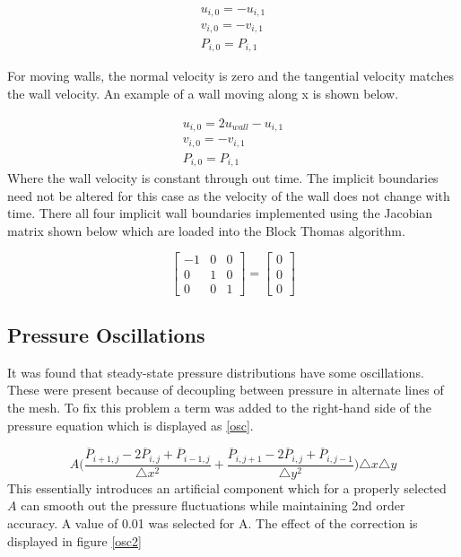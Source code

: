 \documentclass[paper=a4, fontsize=11pt, abstract=on]{scrartcl}
\numberwithin{equation}{section}		%
\numberwithin{figure}{section}			%
\numberwithin{table}{section}				%
\begin{document}
\begin{equation}
  \begin{aligned}
 u_{i,0} = -u_{i,1}
  \\ v_{i,0} = -v_{i,1}\\
  P_{i,0} = P_{i,1}
 \end{aligned}
 \label{bound} 
\end{equation}

For moving walls, the normal velocity is zero and the tangential velocity matches
the wall velocity. An example of a wall moving along x is shown below.

\begin{equation}
  \begin{aligned}
 u_{i,0} = 2u_{wall}-u_{i,1}
  \\ v_{i,0} = -v_{i,1}\\
  P_{i,0} = P_{i,1}
 \end{aligned}
\end{equation}
Where the wall velocity is constant through out time. The implicit boundaries need not be altered for this case as the velocity of the wall does not change with time. There all four implicit wall boundaries implemented using the Jacobian matrix shown below which are loaded into the Block Thomas algorithm.

\begin{equation}
\label{nav2}
\begin{bmatrix}
   -1 & 0& 0 \\
   0 &1 &0 \\
    0 &0& 1
\end{bmatrix} = \begin{bmatrix}
   0 \\
   0 \\
    0
\end{bmatrix}
\end{equation} 

\subsection{Pressure Oscillations}
It was found that steady-state pressure distributions have
some oscillations. These were present because of decoupling between pressure in alternate lines of the mesh. To fix this problem a term was added to the
right-hand side of the pressure equation which is displayed as \ref{osc}. 

 \begin{equation}
\label{osc}
A\Bigg(\frac{\overline{P}_{i+1,j}-2\overline{P}_{i,j}+\overline{P}_{i-1,j} }{\triangle x^2} +\frac{\overline{P}_{i,j+1}-2\overline{P}_{i,j}+\overline{P}_{i,j-1} }{\triangle y^2}\Bigg)\triangle x \triangle y
\end{equation} 
This essentially introduces an artificial component which for a properly selected $A$ can smooth out the pressure fluctuations while maintaining 2nd order accuracy.
A value of 0.01 was selected for A. The effect of the correction is displayed in figure \ref{osc2} 
\end{document}
